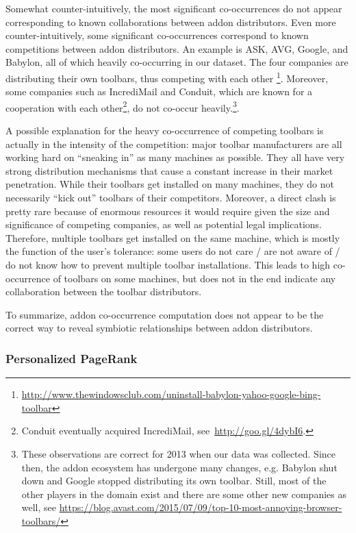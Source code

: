 \documentclass[ijoc,nonblindrev]{informs3} %
\numberwithin{equation}{subsection}
\begin{document}
Somewhat counter-intuitively, the most significant co-occurrences do not appear corresponding to known collaborations between addon distributors. Even more counter-intuitively, some significant co-occurrences correspond to known competitions between addon distributors. An example is ASK, AVG, Google, and Babylon, all of which heavily co-occurring in our dataset. The four companies are distributing their own toolbars, thus competing with each other \footnote{\url{http://www.thewindowsclub.com/uninstall-babylon-yahoo-google-bing-toolbar}}. Moreover, some companies such as IncrediMail and Conduit, which are known for a cooperation with each other\footnote{Conduit eventually acquired IncrediMail, see~\url{http://goo.gl/4dybI6}.}, do not co-occur heavily.\footnote{These observations are correct for 2013 when our data was collected. Since then, the addon ecosystem has undergone many changes, e.g. Babylon shut down and Google stopped distributing its own toolbar. Still, most of the other players in the domain exist and there are some other new companies as well, see \url{https://blog.avast.com/2015/07/09/top-10-most-annoying-browser-toolbars/}}.

A possible explanation for the heavy co-occurrence of competing toolbars is actually in the intensity of the competition: major toolbar manufacturers are all working hard on ``sneaking in'' as many machines as possible. They all have very strong distribution mechanisms that cause a constant increase in their market penetration. While their toolbars get installed on many machines, they do not necessarily ``kick out'' toolbars of their competitors. Moreover, a direct clash is pretty rare because of enormous resources it would require given the size and significance of competing companies, as well as potential legal implications. Therefore, multiple toolbars get installed on the same machine, which is mostly the function of the user's tolerance: some users do not care / are not aware of / do not know how to prevent multiple toolbar installations. This leads to high co-occurrence of toolbars on some machines, but does not in the end indicate any collaboration between the toolbar distributors.

To summarize, addon co-occurrence computation does not appear to be the correct way to reveal symbiotic relationships between addon distributors.

\subsubsection{Personalized PageRank}
\end{document}
